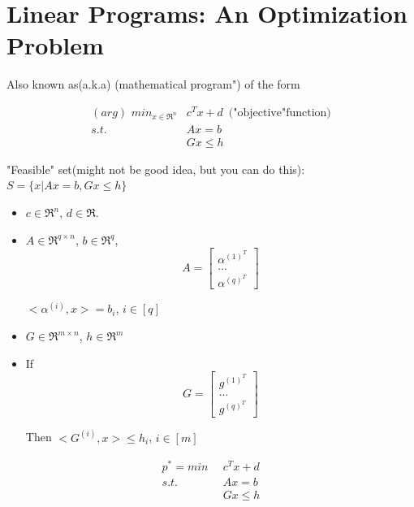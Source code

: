 
\section{Linear Programs: An Optimization Problem}

Also known as(a.k.a) (mathematical program") of the form

\begin{align*}
(arg)\,\,min_{x\in \Re^n}&c^Tx + d\,\,\,\text{("objective"function)}\\
s.t.\,\,\, &Ax = b\\
&Gx \leq h
\end{align*}

"Feasible" set(might not be good idea, but you can do this): $S = \{x|Ax = b, Gx \leq h \}$


\begin{itemize}
	\item $c\in \Re^n$, $d\in \Re$.
	
	\item $A\in \Re^{q\times n}$, $b\in \Re^q$, \begin{equation*}
	A = 
	\begin{bmatrix}
	\alpha^{(1)^T}\\
	...\\
	\alpha^{(q)^T}
	\end{bmatrix}
	\end{equation*}
	
	$<\alpha^{(i)}, x> =b_i$, $i\in \left[q\right]$
	
	\item $G\in \Re^{m\times n}$, $h\in \Re^m$
	
	\item If
	\begin{equation*}
	G = 
	\begin{bmatrix}
	g^{(1)^T}\\
	...\\
	g^{(q)^T}
	\end{bmatrix}
	\end{equation*}
	
	Then $<G^{(i)}, x>\leq h_i$, $i\in \left[m\right]$
	
\end{itemize}





\begin{align*}
p^* = min \,\,\, &c^Tx + d\\
s.t.\,\,\, &Ax = b\\
&Gx\leq h
\end{align*}

